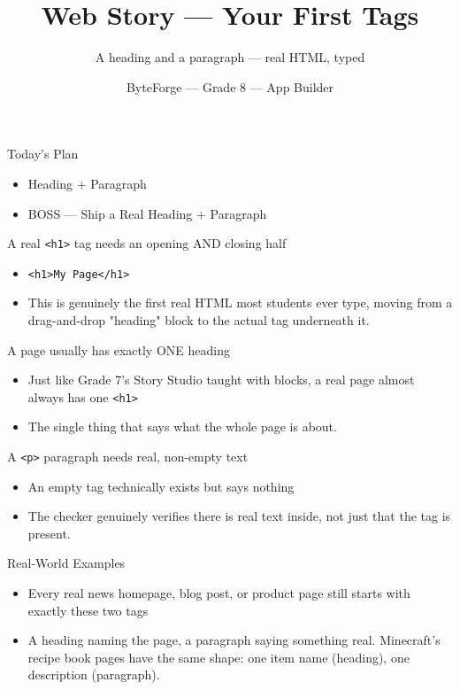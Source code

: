 \documentclass[aspectratio=169]{beamer}
\title{Web Story — Your First Tags}
\subtitle{A heading and a paragraph — real HTML, typed}
\author{ByteForge --- Grade 8 --- App Builder}
\date{}
\begin{document}
\begin{frame}
    \titlepage
\end{frame}

\begin{frame}{Today's Plan}
    \begin{itemize}
        \item Heading + Paragraph
        \item[$\bigstar$] BOSS --- Ship a Real Heading + Paragraph
    \end{itemize}
\end{frame}

\begin{frame}{A real \texttt{<h1>} tag needs an opening AND closing half}
    \large
    \begin{itemize}
        \item \texttt{<h1>My Page</h1>}
        \item This is genuinely the first real HTML most students ever type, moving from a drag-and-drop "heading" block to the actual tag underneath it.
    \end{itemize}
\end{frame}


\begin{frame}{A page usually has exactly ONE heading}
    \large
    \begin{itemize}
        \item Just like Grade 7's Story Studio taught with blocks, a real page almost always has one \texttt{<h1>}
        \item The single thing that says what the whole page is about.
    \end{itemize}
\end{frame}


\begin{frame}{A \texttt{<p>} paragraph needs real, non-empty text}
    \large
    \begin{itemize}
        \item An empty tag technically exists but says nothing
        \item The checker genuinely verifies there is real text inside, not just that the tag is present.
    \end{itemize}
\end{frame}

\begin{frame}{Real-World Examples}
    \large
    \begin{itemize}
        \item Every real news homepage, blog post, or product page still starts with exactly these two tags
        \item A heading naming the page, a paragraph saying something real. Minecraft's recipe book pages have the same shape: one item name (heading), one description (paragraph).
    \end{itemize}
\end{frame}
\end{document}
